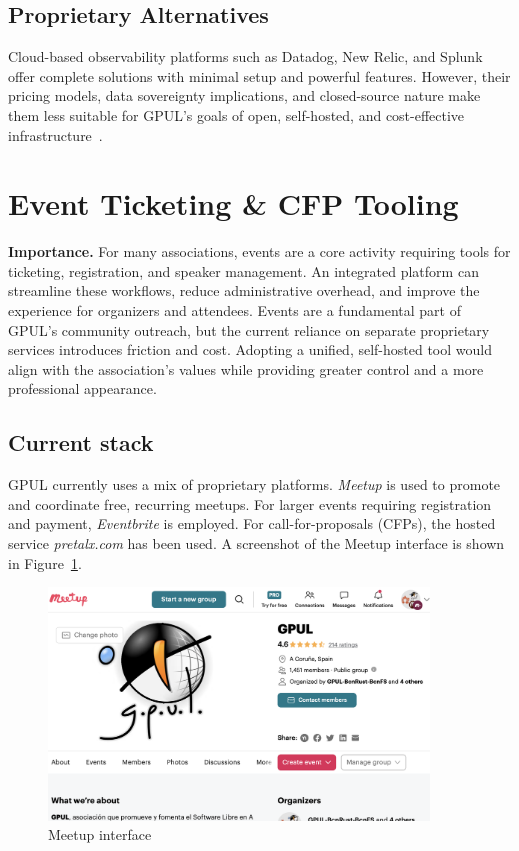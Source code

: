 \subsection*{Proprietary Alternatives}
Cloud-based observability platforms such as Datadog, New Relic, and Splunk offer complete solutions with minimal setup and powerful features. However, their pricing models, data sovereignty implications, and closed-source nature make them less suitable for GPUL's goals of open, self-hosted, and cost-effective infrastructure~\cite{datadog-web}.

\section{Event Ticketing \& CFP Tooling}

\textbf{Importance.} For many associations, events are a core activity requiring tools for ticketing, registration, and speaker management. An integrated platform can streamline these workflows, reduce administrative overhead, and improve the experience for organizers and attendees. Events are a fundamental part of GPUL's community outreach, but the current reliance on separate proprietary services introduces friction and cost. Adopting a unified, self-hosted tool would align with the association's values while providing greater control and a more professional appearance.

\subsection*{Current stack}
GPUL currently uses a mix of proprietary platforms. \emph{Meetup} is used to promote and coordinate free, recurring meetups. For larger events requiring registration and payment, \emph{Eventbrite} is employed. For call-for-proposals (CFPs), the hosted service \emph{pretalx.com} has been used. A screenshot of the Meetup interface is shown in Figure~\ref{fig:meetup-ui}.

\begin{figure}[H]
  \centering
  \includegraphics[width=0.9\textwidth]{imaxes/meetup-ui.png}
  \caption{Meetup interface}
  \label{fig:meetup-ui}
\end{figure}

